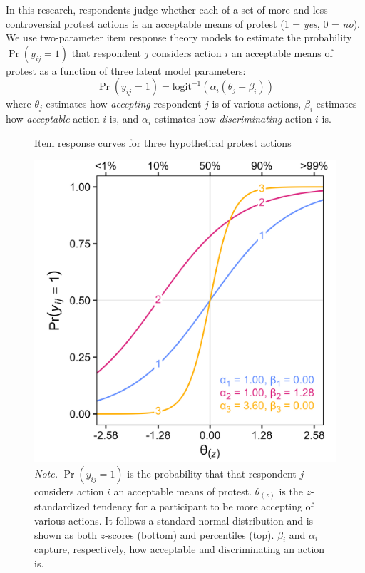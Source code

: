 \documentclass[12pt, letterpaper]{article}
\begin{document}
In this research, respondents judge whether each of a set of more and
less controversial protest actions is an acceptable means of protest (1
= \emph{yes}, 0 = \emph{no}). We use two-parameter item response theory
models to estimate the probability \(\Pr ( y_\textit{ij} = 1 )\) that
respondent \(j\) considers action \(i\) an acceptable means of protest
as a function of three latent model parameters:
\[ \Pr ( y_\textit{ij} = 1 ) = \text{logit}^{-1} ( \alpha_i ( \theta_j + \beta_i ) ) \]
where \(\theta_j\) estimates how \emph{accepting} respondent \(j\) is of
various actions, \(\beta_i\) estimates how \emph{acceptable} action
\(i\) is, and \(\alpha_i\) estimates how \emph{discriminating} action
\(i\) is.

\begin{figure}
\centering
\caption{Item response curves for three hypothetical protest actions}
\includegraphics[scale=1]{../Scale Development/figures/figure-1.png}
\caption*{\textit{Note.} $\Pr ( y_\textit{ij} = 1 )$ is the probability that that respondent $j$ considers action $i$ an acceptable means of protest. $\theta_{(z)}$ is the $z$-standardized tendency for a participant to be more accepting of various actions. It follows a standard normal distribution and is shown as both $z$-scores (bottom) and percentiles (top). $\beta_i$ and $\alpha_i$ capture, respectively, how acceptable and discriminating an action is.}
\label{fig:f1}
\end{figure}
\end{document}
